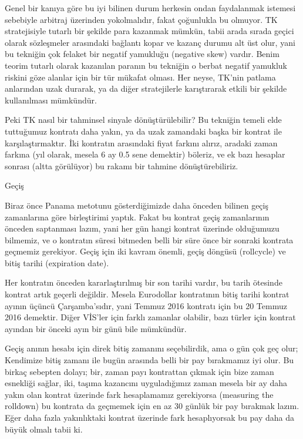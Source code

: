 \documentclass[12pt,fleqn]{article}\usepackage{../../common}
\begin{document}
Genel bir kanıya göre bu iyi bilinen durum herkesin ondan faydalanmak istemesi
sebebiyle arbitraj üzerinden yokolmalıdır, fakat çoğunlukla bu olmuyor. TK
stratejisiyle tutarlı bir şekilde para kazanmak mümkün, tabii arada sırada
geçici olarak sözleşmeler arasındaki bağlantı kopar ve kazanç durumu alt üst
olur, yani bu tekniğin çok felaket bir negatif yamukluğu (negative skew)
vardır. Benim teorim tutarlı olarak kazanılan paranın bu tekniğin o berbat
negatif yamukluk riskini göze alanlar için bir tür mükafat olması. Her neyse,
TK'nin patlama anlarından uzak durarak, ya da diğer stratejilerle karıştırarak
etkili bir şekilde kullanılması mümkündür.

Peki TK nasıl bir tahminsel sinyale dönüştürülebilir? Bu tekniğin temeli elde
tuttuğumuz kontratı daha yakın, ya da uzak zamandaki başka bir kontrat ile
karşılaştırmaktır. İki kontratın arasındaki fiyat farkını alırız, aradaki zaman
farkına (yıl olarak, mesela 6 ay 0.5 sene demektir) böleriz, ve ek bazı hesaplar
sonrası (altta görülüyor) bu rakamı bir tahmine dönüştürebiliriz. 

Geçiş

Biraz önce Panama metotunu gösterdiğimizde daha önceden bilinen geçiş
zamanlarına göre birleştirimi yaptık. Fakat bu kontrat geçiş zamanlarının
önceden saptanması lazım, yani her gün hangi kontrat üzerinde olduğumuzu
bilmemiz, ve o kontratın süresi bitmeden belli bir süre önce bir sonraki
kontrata geçmemiz gerekiyor. Geçiş için iki kavram önemli, geçiş döngüsü
(rollcycle) ve bitiş tarihi (expiration date).

Her kontratın önceden kararlaştırılmış bir son tarihi vardır, bu tarih ötesinde
kontrat artık geçerli değildir. Mesela Eurodollar kontratının bitiş tarihi
kontrat ayının üçüncü Çarşamba'sıdır, yani Temmuz 2016 kontratı için bu 20
Temmuz 2016 demektir. Diğer VİS'ler için farklı zamanlar olabilir, bazı türler
için kontrat ayından bir önceki ayın bir günü bile mümkündür.

Geçiş anının hesabı için direk bitiş zamanını seçebilirdik, ama o gün çok geç
olur; Kendimize bitiş zamanı ile bugün arasında belli bir pay bırakmamız iyi
olur. Bu birkaç sebepten dolayı; bir, zaman payı kontrattan çıkmak için bize
zaman esnekliği sağlar, iki, taşıma kazancını uyguladığımız zaman mesela bir ay
daha yakın olan kontrat üzerinde fark hesaplamamız gerekiyorsa (measuring the
rolldown) bu kontrata da geçmemek için en az 30 günlük bir pay bırakmak
lazım. Eğer daha fazla yakınlıktaki kontrat üzerinde fark hesaplıyorsak bu pay
daha da büyük olmalı tabii ki.
\end{document}
